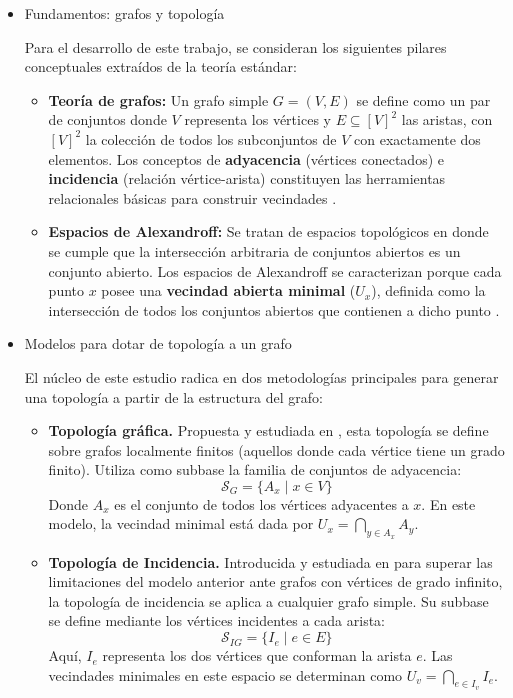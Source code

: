 \documentclass{article}
\begin{document}
\begin{itemize}
\begin{itemize}
   \item Fundamentos: grafos y topología

Para el desarrollo de este trabajo, se consideran los siguientes pilares conceptuales extraídos de la teoría estándar:

\begin{itemize}
   \item \textbf{Teoría de grafos:} Un grafo simple $G = (V, E)$ se define como un par de conjuntos donde $V$ representa los vértices y $E \subseteq [V]^2$ las aristas, con $[V]^2$ la colección de todos los subconjuntos de $V$ con exactamente dos elementos. Los conceptos de \textbf{adyacencia} (vértices conectados) e \textbf{incidencia} (relación vértice-arista) constituyen las herramientas relacionales básicas para construir vecindades \cite{jafarian2013, kilicman2018}.
    \item \textbf{Espacios de Alexandroff:} Se tratan de espacios topológicos en donde se cumple que la intersección arbitraria de conjuntos abiertos es un conjunto abierto. Los espacios de Alexandroff se caracterizan porque cada punto $x$ posee una \textbf{vecindad abierta minimal} ($U_x$), definida como la intersección de todos los conjuntos abiertos que contienen a dicho punto \cite{jafarian2013, kilicman2018}.
\end{itemize}

\item Modelos para dotar de topología a un grafo

El núcleo de este estudio radica en dos metodologías principales para generar una topología a partir de la estructura del grafo:

\begin{itemize}
   \item \textbf{Topología gráfica.}
   Propuesta y estudiada en \cite{jafarian2013}, esta topología se define sobre grafos localmente finitos (aquellos donde cada vértice tiene un grado finito). Utiliza como subbase la familia de conjuntos de adyacencia:
\begin{equation*}
    \mathcal{S}_G = \{A_x \mid x \in V\}
\end{equation*}
Donde $A_x$ es el conjunto de todos los vértices adyacentes a $x$. En este modelo, la vecindad minimal está dada por $U_x = \bigcap_{y \in A_x} A_y$.

\item \textbf{Topología de Incidencia.}
   Introducida y estudiada en \cite{kilicman2018} para superar las limitaciones del modelo anterior ante grafos con vértices de grado infinito, la topología de incidencia se aplica a cualquier grafo simple. Su subbase se define mediante los vértices incidentes a cada arista:
\begin{equation*}
    \mathcal{S}_{IG} = \{I_e \mid e \in E\}
\end{equation*}
Aquí, $I_e$ representa los dos vértices que conforman la arista $e$. Las vecindades minimales en este espacio se determinan como $U_v = \bigcap_{e \in I_v} I_e$.
\end{itemize}


\end{itemize}
\end{itemize}
\end{document}

